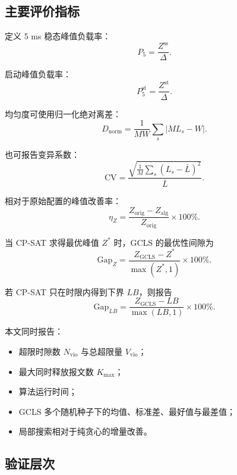 \documentclass[UTF8,12pt,a4paper]{ctexart}
\begin{document}
\subsection{主要评价指标}

定义 5 ms 稳态峰值负载率：
\begin{equation}
 P_5=\frac{Z^{\mathrm{ss}}}{\Delta}.
\end{equation}

启动峰值负载率：
\begin{equation}
 P^{\mathrm{st}}_5=\frac{Z^{\mathrm{st}}}{\Delta}.
\end{equation}

均匀度可使用归一化绝对离差：
\begin{equation}
 D_{\mathrm{norm}}=
 \frac{1}{MW}\sum_s\left|ML_s-W\right|.
\end{equation}

也可报告变异系数：
\begin{equation}
 \mathrm{CV}=\frac{\sqrt{\frac{1}{M}\sum_s(L_s-\bar L)^2}}{\bar L}.
\end{equation}

相对于原始配置的峰值改善率：
\begin{equation}
 \eta_Z=\frac{Z_{\mathrm{orig}}-Z_{\mathrm{alg}}}{Z_{\mathrm{orig}}}\times100\%.
\end{equation}

当 CP-SAT 求得最优峰值 $Z^*$ 时，GCLS 的最优性间隙为
\begin{equation}
 \mathrm{Gap}_Z=
 \frac{Z_{\mathrm{GCLS}}-Z^*}{\max(Z^*,1)}\times100\%.
\end{equation}

若 CP-SAT 只在时限内得到下界 $LB$，则报告
\begin{equation}
 \mathrm{Gap}_{LB}=
 \frac{Z_{\mathrm{GCLS}}-LB}{\max(LB,1)}\times100\%.
\end{equation}

本文同时报告：

\begin{itemize}
  \item 超限时隙数 $N_{\mathrm{vio}}$ 与总超限量 $V_{\mathrm{vio}}$；
  \item 最大同时释放报文数 $K_{\max}$；
  \item 算法运行时间；
  \item GCLS 多个随机种子下的均值、标准差、最好值与最差值；
  \item 局部搜索相对于纯贪心的增量改善。
\end{itemize}

\subsection{验证层次}
\end{document}
